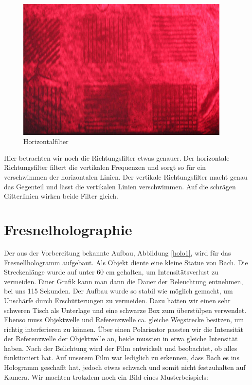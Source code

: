 \begin{figure}[H]
\begin{minipage}{0.33\textwidth}
                     \includegraphics[width=0.95\textwidth]{Abb/Abb_19.JPG} 
                     \caption{Horizontalfilter}
                  \end{minipage}
            \end{figure}

Hier betrachten wir noch die Richtungsfilter etwas genauer.
Der horizontale Richtungsfilter filtert die vertikalen Frequenzen und sorgt so für ein verschwimmen der horizontalen Linien. Der vertikale Richtungsfilter macht genau das Gegenteil und lässt die vertikalen Linien verschwimmen. Auf die schrägen Gitterlinien wirken beide Filter gleich.

    \section{Fresnelholographie}

Der aus der Vorbereitung bekannte Aufbau, Abbildung \ref{holo1}, wird für das Fresnellhologramm aufgebaut. Als Objekt diente eine kleine Statue von Bach. Die Streckenlänge wurde auf unter 60 cm gehalten, um Intensitätsverlust zu vermeiden. Einer Grafik kann man dann die Dauer der Beleuchtung entnehmen, bei uns 115 Sekunden. Der Aufbau wurde so stabil wie möglich gemacht, um Unschärfe durch Erschütterungen zu vermeiden. Dazu hatten wir einen sehr schweren Tisch als Unterlage und eine schwarze Box zum überstülpen verwendet. Ebenso muss Objektwelle und Referenzwelle ca. gleiche Wegstrecke besitzen, um richtig interferieren zu können. Über einen Polarisator passten wir die Intensität der Referenzwelle der Objektwelle an, beide mussten in etwa gleiche Intensität haben.
Nach der Belichtung wird der Film entwickelt und beobachtet, ob alles funktioniert hat. Auf unserem Film war lediglich zu erkennen, dass Bach es ins Hologramm geschafft hat, jedoch etwas schwach und somit nicht festzuhalten auf Kamera. Wir machten trotzdem noch ein Bild eines Musterbeispiels:

